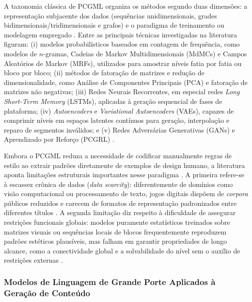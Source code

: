 A taxonomia clássica de PCGML organiza os métodos segundo duas dimensões: a representação subjacente dos dados (sequências unidimensionais, grades bidimensionais/tridimensionais e grafos) e o paradigma de treinamento ou modelagem empregado \cite{summerville2018procedural}. Entre as principais técnicas investigadas na literatura figuram: (i) modelos probabilísticos baseados em contagem de frequência, como modelos de $n$-gramas, Cadeias de Markov Multidimensionais (MdMCs) e Campos Aleatórios de Markov (MRFs), utilizados para amostrar níveis fatia por fatia ou bloco por bloco; (ii) métodos de fatoração de matrizes e redução de dimensionalidade, como Análise de Componentes Principais (PCA) e fatoração de matrizes não negativas; (iii) Redes Neurais Recorrentes, em especial redes \textit{Long Short-Term Memory} (LSTMs), aplicadas à geração sequencial de fases de plataforma; (iv) \textit{Autoencoders} e \textit{Variational Autoencoders} (VAEs), capazes de comprimir níveis em espaços latentes contínuos para geração, interpolação e reparo de segmentos inválidos; e (v) Redes Adversárias Generativas (GANs) e Aprendizado por Reforço (PCGRL) \cite{summerville2018procedural, maleki2024procedural}.

Embora o PCGML reduza a necessidade de codificar manualmente regras de estilo ao extrair padrões diretamente de exemplos de design humano, a literatura aponta limitações estruturais importantes nesse paradigma \cite{summerville2018procedural, maleki2024procedural, her2025zeroshot3dmapgeneration}. A primeira refere-se à escassez crônica de dados (\textit{data scarcity}): diferentemente de domínios como visão computacional ou processamento de texto, jogos digitais dispõem de \textit{corpora} públicos reduzidos e carecem de formatos de representação padronizados entre diferentes títulos \cite{summerville2018procedural}. A segunda limitação diz respeito à dificuldade de assegurar restrições funcionais globais: modelos puramente estatísticos treinados sobre matrizes visuais ou sequências locais de blocos frequentemente reproduzem padrões estéticos plausíveis, mas falham em garantir propriedades de longo alcance, como a conectividade global e a solvabilidade do nível sem o auxílio de restrições externas \cite{summerville2018procedural, maleki2024procedural}.

\subsubsection{Modelos de Linguagem de Grande Porte Aplicados à Geração de Conteúdo}
\label{sec:llms_pcg}

